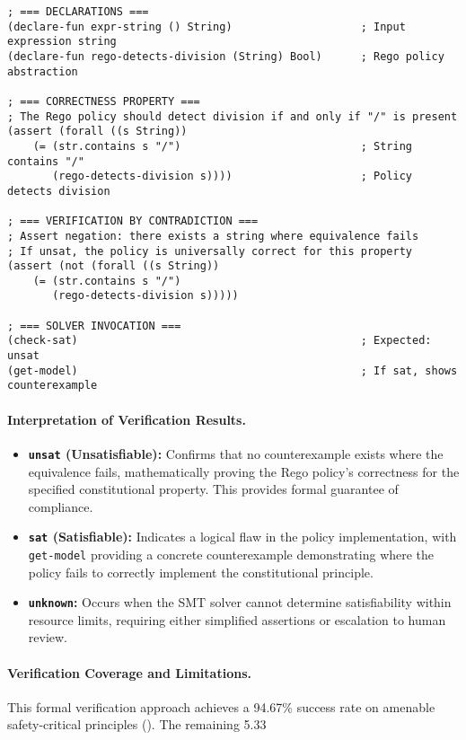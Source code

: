 \documentclass[manuscript,screen,9pt]{acmart}
\begin{document}
\begin{table}[!htb]
\begin{lstlisting}
; === DECLARATIONS ===
(declare-fun expr-string () String)                    ; Input expression string
(declare-fun rego-detects-division (String) Bool)      ; Rego policy abstraction

; === CORRECTNESS PROPERTY ===
; The Rego policy should detect division if and only if "/" is present
(assert (forall ((s String))
    (= (str.contains s "/")                            ; String contains "/"
       (rego-detects-division s))))                    ; Policy detects division

; === VERIFICATION BY CONTRADICTION ===
; Assert negation: there exists a string where equivalence fails
; If unsat, the policy is universally correct for this property
(assert (not (forall ((s String))
    (= (str.contains s "/")
       (rego-detects-division s)))))

; === SOLVER INVOCATION ===
(check-sat)                                            ; Expected: unsat
(get-model)                                            ; If sat, shows counterexample
\end{lstlisting}

\paragraph{Interpretation of Verification Results.}
\begin{itemize}[leftmargin=*,itemsep=2pt,parsep=1pt]
    \item \textbf{\texttt{unsat} (Unsatisfiable):} Confirms that no counterexample exists where the equivalence fails, mathematically proving the Rego policy's correctness for the specified constitutional property. This provides formal guarantee of compliance.
    \item \textbf{\texttt{sat} (Satisfiable):} Indicates a logical flaw in the policy implementation, with \texttt{get-model} providing a concrete counterexample demonstrating where the policy fails to correctly implement the constitutional principle.
    \item \textbf{\texttt{unknown}:} Occurs when the SMT solver cannot determine satisfiability within resource limits, requiring either simplified assertions or escalation to human review.
\end{itemize}

\paragraph{Verification Coverage and Limitations.} This formal verification approach achieves a 94.67\% success rate on amenable safety-critical principles (). The remaining 5.33%


\end{table}
\end{document}
